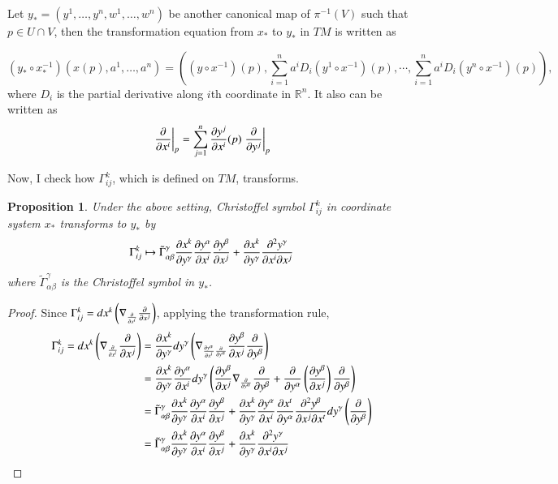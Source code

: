 \documentclass[a4paper, 12pt]{article}
\theoremstyle{Mydefinition}
\theoremstyle{Mytheorem}
\newtheorem{proposition}[statement]{Proposition}
\begin{document}
Let $y_*=(y^1, \ldots, y^n, w^1, \ldots, w^n)$ be another canonical map of $\pi^{-1}(V)$ such that $p\in U\cap V$, then the transformation equation from $x_*$ to $y_*$ in $TM$ is written as

\begin{equation*}
    (y_*\circ x_*^{-1})(x(p), a^1, \ldots, a^n) = \left((y\circ x^{-1})(p), \sum_{i=1}^n a^i D_i(y^1\circ x^{-1})(p), \cdots, \sum_{i=1}^n a^i D_i(y^n\circ x^{-1})(p)\right),
\end{equation*}
where $D_i$ is the partial derivative along $i$th coordinate in $\mathbb{R}^n$. It also can be written as
\begin{equation*}
    \left.\pdv{x^i}\right|_{p} = \sum_{j=1}^n \frac{\partial y^j}{\partial x^i}(p)\left.\pdv{y^j}\right|_{p}
\end{equation*}

Now, I check how $\Gamma_{ij}^k$, which is defined on $TM$, transforms.
\begin{proposition}
Under the above setting, Christoffel symbol $\Gamma_{ij}^k$ in coordinate system $x_*$ transforms to $y_*$ by
\begin{equation*}
    \Gamma_{ij}^k\mapsto \tilde{\Gamma}_{\alpha\beta}^\gamma \pdv{x^k}{y^\gamma}\pdv{y^\alpha}{x^i}\pdv{y^\beta}{x^j} + \pdv{x^k}{y^\gamma}\frac{\partial^2 y^\gamma}{\partial x^i \partial x^j}
\end{equation*}
where $\tilde{\Gamma}_{\alpha\beta}^\gamma$ is the Christoffel symbol in $y_*$.
\end{proposition}
\begin{proof}
Since $\Gamma_{ij}^k = dx^k\left(\nabla_{\pdv{x^i}}\pdv{x^j} \right)$, applying the transformation rule,
\begin{equation*}
    \begin{split}
        \Gamma_{ij}^k = dx^k\left(\nabla_{\pdv{x^i}}\pdv{x^j} \right) &= \pdv{x^k}{y^\gamma}dy^\gamma \left(\nabla_{\pdv{y^\alpha}{x^i}\pdv{y^\alpha}}\pdv{y^\beta}{x^j}\pdv{y^\beta} \right)\\
        &=\pdv{x^k}{y^\gamma}\pdv{y^\alpha}{x^i}dy^\gamma \left(\pdv{y^\beta}{x^j}\nabla_{\pdv{y^\alpha}}\pdv{y^\beta} + \pdv{y^\alpha}\left(\pdv{y^\beta}{x^j}\right)\pdv{y^\beta} \right)\\
        &=\tilde{\Gamma}_{\alpha\beta}^\gamma \pdv{x^k}{y^\gamma}\pdv{y^\alpha}{x^i}\pdv{y^\beta}{x^j} + \pdv{x^k}{y^\gamma}\pdv{y^\alpha}{x^i}\pdv{x^t}{y^\alpha}\frac{\partial^2 y^\beta}{\partial x^j \partial x^t}dy^\gamma\left(\pdv{y^\beta}\right)\\
        &=\tilde{\Gamma}_{\alpha\beta}^\gamma \pdv{x^k}{y^\gamma}\pdv{y^\alpha}{x^i}\pdv{y^\beta}{x^j} + \pdv{x^k}{y^\gamma}\frac{\partial^2 y^\gamma}{\partial x^i \partial x^j}
    \end{split}
\end{equation*}
\end{proof}
\end{document}
